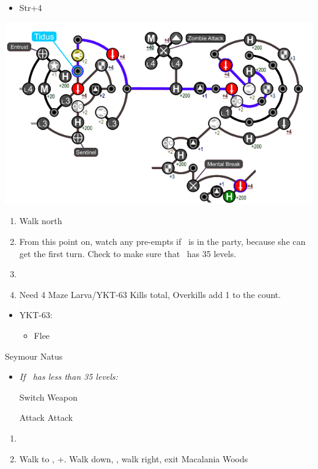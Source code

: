 \begin{spheregrid}
\begin{itemize}
\begin{itemize}
			      \item Str+4
		      \end{itemize}
		      \includegraphics[width=.9\columnwidth]{graphics/Yuna_blitz_loss_highbridge_1}
	\end{itemize}
\end{spheregrid}
\begin{enumerate}
	\item Walk north
	\item From this point on, watch any pre-empts if \yuna\ is in the party, because she can get the first turn. Check to make sure that \lulu\ has 35 levels.
	\item \formation{\tidus}{\yuna}{\auron}
	\item Need 4 Maze Larva/YKT-63 Kills total, Overkills add 1 to the count.
\end{enumerate}
\begin{encounters}
	\begin{itemize}
		\item YKT-63:
		      \begin{itemize}
			      \tidusf Attack
			      \yunaf Attack
			      \item Flee
		      \end{itemize}
	\end{itemize}
\end{encounters}
\begin{battle}[36000]{Seymour Natus}
	\begin{itemize}
		\item \textit{If \lulu\ has less than 35 levels:}
		      \begin{itemize}
			      \switch{\tidus}{\lulu}
			      \luluf Switch Weapon
			      \switch{\lulu}{\tidus}
		      \end{itemize}
		      \tidusf Attack
		      \summon{\bahamut}
		      \bahamutf Attack
	\end{itemize}
\end{battle}
\begin{enumerate}[resume]
	\item \sd
	\item Walk to \yuna, \cs+\skippablefmv[10:10]. Walk down, \cs[1:40], walk right, exit Macalania Woods
\end{enumerate}